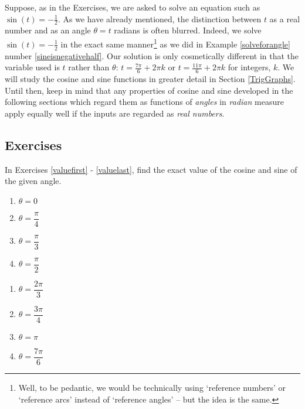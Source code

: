 Suppose, as in the Exercises, we are asked to solve an equation such as $\sin(t) = -\frac{1}{2}$.  As we have already mentioned, the distinction between $t$ as a real number and as an angle $\theta = t$ radians is often blurred. Indeed, we solve $\sin(t) = -\frac{1}{2}$ in the exact same manner\footnote{Well, to be pedantic, we would be technically using `reference numbers' or `reference arcs' instead of `reference angles' -- but the idea is the same.} as we did in Example \ref{solveforangle} number \ref{sineisnegativehalf}.  Our solution is only cosmetically different in that the variable used is $t$ rather than $\theta$:  $t = \frac{7\pi}{6} + 2\pi k$ or  $t = \frac{11\pi}{6} + 2\pi k$ for integers, $k$.  We will study the cosine and sine functions in greater detail in Section \ref{TrigGraphs}.  Until then, keep in mind that any properties of cosine and sine developed in the following sections which regard them as functions of \textit{angles} in \textit{radian} measure apply equally well if the inputs are regarded as \textit{real numbers}.

\newpage

\subsection{Exercises}

In Exercises \ref{valuefirst} - \ref{valuelast}, find the exact value of the cosine and sine of the given angle.

\begin{multicols}{4}

\begin{enumerate}

\item $\theta = 0$  \label{valuefirst}
\item $\theta = \dfrac{\pi}{4}$
\item $\theta = \dfrac{\pi}{3}$
\item $\theta = \dfrac{\pi}{2}$

\setcounter{HW}{\value{enumi}}

\end{enumerate}

\end{multicols}

\begin{multicols}{4}

\begin{enumerate}

\setcounter{enumi}{\value{HW}}

\item $\theta = \dfrac{2\pi}{3}$
\item $\theta = \dfrac{3\pi}{4}$
\item $\theta = \pi$ 
\item $\theta = \dfrac{7\pi}{6}$

\setcounter{HW}{\value{enumi}}

\end{enumerate}

\end{multicols}

